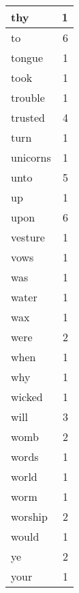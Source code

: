 \begin{center}
\begin{longtable}{l|r}
thy & 1 \\ \hline
to & 6 \\ \hline
tongue & 1 \\ \hline
took & 1 \\ \hline
trouble & 1 \\ \hline
trusted & 4 \\ \hline
turn & 1 \\ \hline
unicorns & 1 \\ \hline
unto & 5 \\ \hline
up & 1 \\ \hline
upon & 6 \\ \hline
vesture & 1 \\ \hline
vows & 1 \\ \hline
was & 1 \\ \hline
water & 1 \\ \hline
wax & 1 \\ \hline
were & 2 \\ \hline
when & 1 \\ \hline
why & 1 \\ \hline
wicked & 1 \\ \hline
will & 3 \\ \hline
womb & 2 \\ \hline
words & 1 \\ \hline
world & 1 \\ \hline
worm & 1 \\ \hline
worship & 2 \\ \hline
would & 1 \\ \hline
ye & 2 \\ \hline
your & 1 \\ \hline
\end{longtable}
\end{center}



\normalsize



